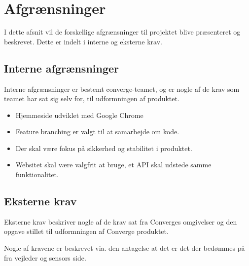 \chapter{Afgrænsninger} %
\label{cha:constraints}

I dette afsnit vil de forskellige afgrænsninger til projektet blive præsenteret og beskrevet. Dette er indelt i interne og eksterne krav.

\section{Interne afgrænsninger}

Interne afgrænsninger er bestemt converge-teamet, og er nogle af de krav som teamet har sat sig selv for, til udformningen af produktet.

\begin{itemize}
  \item Hjemmeside udviklet med Google Chrome
  \item Feature branching er valgt til at samarbejde om kode.
  \item Der skal være fokus på sikkerhed og stabilitet i produktet.
  \item Websitet skal være valgfrit at bruge, et API skal udstede samme funktionalitet.
\end{itemize}

\section{Eksterne krav}

Eksterne krav beskriver nogle af de krav sat fra Converges omgivelser og den opgave stillet til udformningen af Converge produktet.

Nogle af kravene er beskrevet via. den antagelse at det er det der bedømmes på fra vejleder og sensors side.

